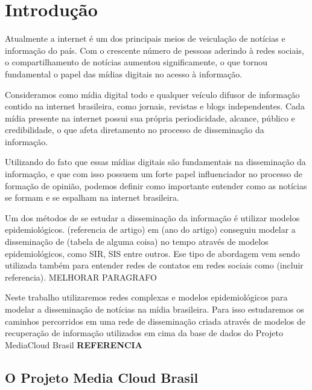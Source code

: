 \documentclass[a4paper,12pt]{article}
\begin{document}
\pagebreak

\section{Introdução}

Atualmente a internet é um dos principais meios de veiculação de notícias e informação do país. Com o crescente
número de pessoas aderindo à redes sociais, o compartilhamento de notícias aumentou significamente, o que tornou fundamental
o papel das mídias digitais no acesso à informação.

Consideramos como mídia digital todo e qualquer veículo difusor de informação contido na internet brasileira, como jornais, revistas e 
blogs independentes. Cada mídia presente na internet possui sua própria periodicidade, alcance, público e credibilidade, o que afeta
diretamento no processo de disseminação da informação.

Utilizando do fato que essas mídias digitais são fundamentais na disseminação da informação, e que com isso possuem um forte papel 
influenciador no processo de formação de opinião, podemos definir como importante entender como as notícias se formam e se espalham
na internet brasileira.

Um dos métodos de se estudar a disseminação da informação é utilizar modelos epidemiológicos. (referencia de artigo) em (ano do artigo)
conseguiu modelar a disseminação de (tabela de alguma coisa) no tempo através de modelos epidemiológicos, como SIR, SIS entre outros. Ese tipo
de abordagem vem sendo utilizada também para entender redes de contatos em redes sociais como (incluir referencia). MELHORAR PARAGRAFO

Neste trabalho utilizaremos redes complexas e modelos epidemiológicos para modelar a disseminação de notícias na mídia brasileira. 
Para isso
estudaremos os caminhos percorridos em uma rede de disseminação criada através de modelos de recuperação de informação utilizados em cima
da base de dados do Projeto MediaCloud Brasil \textbf{REFERENCIA}

\subsection{O Projeto Media Cloud Brasil}
\end{document}
